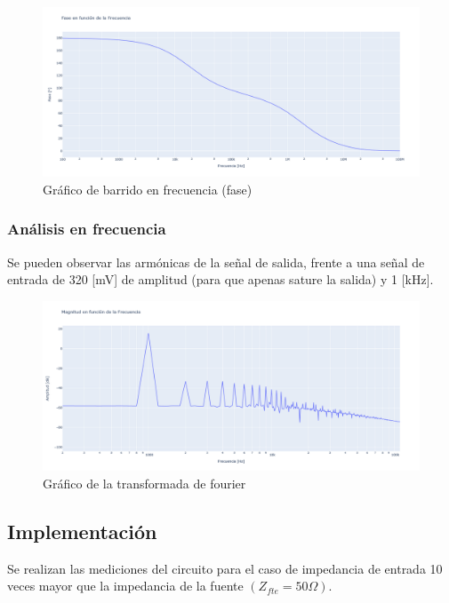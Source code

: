 \newpage

\begin{figure}[h!]
    \centering
    \includegraphics[width=0.80\linewidth]{img/Lab2_Bode1_fase.png}
    \caption{Gráfico de barrido en frecuencia (fase)}
    \label{fig:bode1f}
\end{figure}

\subsubsection{Análisis en frecuencia }

Se pueden observar las armónicas de la señal de salida, frente a una señal de entrada de 320 [mV] de amplitud (para que apenas sature la salida) y 1 [kHz].
\begin{figure}[h!]
    \centering
    \includegraphics[width=1.0\linewidth]{img/Lab2_Fourier.png}
    \caption{Gráfico de la transformada de fourier}
    \label{fig:fft1a}
\end{figure}

\subsection{Implementación}

\hspace{1mm} Se realizan las mediciones del circuito para el caso de impedancia de entrada 10 veces mayor que la impedancia de la fuente \((Z_{fte}= 50\Omega)\).

